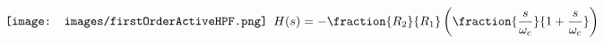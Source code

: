     \begin{align}
        \vcenter{\hbox{\texttt{[image: images/firstOrderActiveHPF.png]}}}
        &
        \hspace{5pt} H(s) = -\fraction{R_2}{R_1}\left(\fraction{\frac{s}{\omega_c}}{1+\frac{s}{\omega_c}}\right) \nonumber
    \end{align}